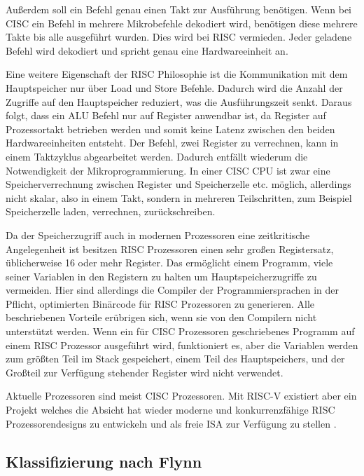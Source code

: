 \documentclass[12pt]{article}
\begin{document}
Außerdem soll ein Befehl genau einen Takt zur Ausführung benötigen. Wenn bei CISC ein Befehl in mehrere Mikrobefehle dekodiert wird, benötigen diese mehrere Takte bis alle ausgeführt wurden. Dies wird bei RISC vermieden. Jeder geladene Befehl wird dekodiert und spricht genau eine Hardwareeinheit an.

Eine weitere Eigenschaft der RISC Philosophie ist die Kommunikation mit dem Hauptspeicher nur über Load und Store Befehle. Dadurch wird die Anzahl der Zugriffe auf den Hauptspeicher reduziert, was die Ausführungszeit senkt. Daraus folgt, dass ein ALU Befehl nur auf Register anwendbar ist, da Register auf Prozessortakt betrieben werden und somit keine Latenz zwischen den beiden Hardwareeinheiten entsteht. Der Befehl, zwei Register zu verrechnen, kann in einem Taktzyklus abgearbeitet werden. Dadurch entfällt wiederum die Notwendigkeit der Mikroprogrammierung. In einer CISC CPU ist zwar eine Speicherverrechnung zwischen Register und Speicherzelle etc. möglich, allerdings nicht skalar, also in einem Takt, sondern in mehreren Teilschritten, zum Beispiel Speicherzelle laden, verrechnen, zurückschreiben.


Da der Speicherzugriff auch in modernen Prozessoren eine zeitkritische Angelegenheit ist besitzen RISC Prozessoren einen sehr großen Registersatz, üblicherweise 16 oder mehr Register. Das ermöglicht einem Programm, viele seiner Variablen in den Registern zu halten um Hauptspeicherzugriffe zu vermeiden. Hier sind allerdings die Compiler der Programmiersprachen in der Pflicht, optimierten Binärcode für RISC Prozessoren zu generieren. Alle beschriebenen Vorteile erübrigen sich, wenn sie von den Compilern nicht unterstützt werden. Wenn ein für CISC Prozessoren geschriebenes Programm auf einem RISC Prozessor ausgeführt wird, funktioniert es, aber die Variablen werden zum größten Teil im Stack gespeichert, einem Teil des Hauptspeichers, und der Großteil zur Verfügung stehender Register wird nicht verwendet. 
\par
Aktuelle Prozessoren sind meist CISC Prozessoren. Mit RISC-V existiert aber ein Projekt welches die Absicht hat wieder moderne und konkurrenzfähige RISC Prozessorendesigns zu entwickeln und als freie ISA zur Verfügung zu stellen . 
\subsection{Klassifizierung nach Flynn}
\end{document}
